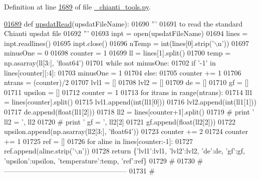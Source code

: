 Definition at line \hyperlink{__chianti__tools_8py_source_l01689}{1689} of file \hyperlink{__chianti__tools_8py_source}{\+\_\+chianti\+\_\+tools.\+py}.


\begin{DoxyCode}
\hypertarget{namespacepyneb_1_1utils_1_1__chianti__tools_l01689}{}\hyperlink{namespacepyneb_1_1utils_1_1__chianti__tools_a4fab6d9973653d9ca82088006f2a12fe}{01689} \textcolor{keyword}{def }\hyperlink{namespacepyneb_1_1utils_1_1__chianti__tools_a4fab6d9973653d9ca82088006f2a12fe}{upsdatRead}(upsdatFileName):
01690     \textcolor{stringliteral}{'''}
01691 \textcolor{stringliteral}{    to read the standard Chianti upsdat file}
01692 \textcolor{stringliteral}{    '''}
01693     inpt = open(upsdatFileName)
01694     lines = inpt.readlines()
01695     inpt.close()
01696     nTemp = int(lines[0].strip(\textcolor{stringliteral}{'\(\backslash\)n'}))
01697     minusOne = 0
01698     counter = 1
01699     ll = lines[1].split()
01700     temp = np.asarray(ll[3:], \textcolor{stringliteral}{'float64'})
01701     \textcolor{keywordflow}{while} \textcolor{keywordflow}{not} minusOne:
01702         \textcolor{keywordflow}{if} \textcolor{stringliteral}{'-1'} \textcolor{keywordflow}{in} lines[counter][:4]:
01703             minusOne = 1
01704         \textcolor{keywordflow}{else}:
01705             counter += 1
01706     ntrans = (counter)/2
01707     lvl1 = []
01708     lvl2 = []
01709     de = []
01710     gf = []
01711     upsilon = []
01712     counter = 1
01713     \textcolor{keywordflow}{for} itrans \textcolor{keywordflow}{in} range(ntrans):
01714         ll1 = lines[counter].split()
01715         lvl1.append(int(ll1[0]))
01716         lvl2.append(int(ll1[1]))
01717         de.append(float(ll1[2]))
01718         ll2 = lines[counter+1].split()
01719 \textcolor{comment}{#        print ' ll2 = ', ll2}
01720 \textcolor{comment}{#        print ' gf = ', ll2[2]}
01721         gf.append(float(ll2[2]))
01722         upsilon.append(np.asarray(ll2[3:], \textcolor{stringliteral}{'float64'}))
01723         counter += 2
01724     counter += 1
01725     ref = []
01726     \textcolor{keywordflow}{for} aline \textcolor{keywordflow}{in} lines[counter:-1]:
01727         ref.append(aline.strip(\textcolor{stringliteral}{'\(\backslash\)n'}))
01728     \textcolor{keywordflow}{return} \{\textcolor{stringliteral}{'lvl1'}:lvl1, \textcolor{stringliteral}{'lvl2'}:lvl2, \textcolor{stringliteral}{'de'}:de, \textcolor{stringliteral}{'gf'}:gf, \textcolor{stringliteral}{'upsilon'}:upsilon, \textcolor{stringliteral}{'temperature'}:temp, \textcolor{stringliteral}{'ref'}:ref\}
01729     \textcolor{comment}{#}
01730     \textcolor{comment}{# -----------------------------------------------------}
01731     \textcolor{comment}{#}
\end{DoxyCode}
\hypertarget{namespacepyneb_1_1utils_1_1__chianti__tools_addacad8fe4cf3dff7f457b8b4a58054f}{}
